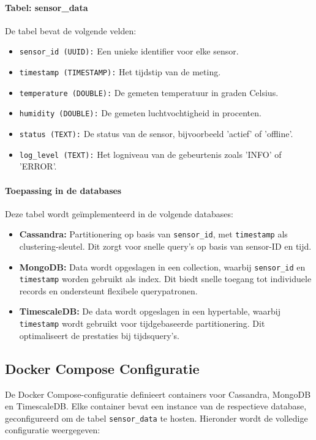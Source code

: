 \paragraph{Tabel: sensor\_data}
De tabel bevat de volgende velden:
\begin{itemize}
    \item \texttt{sensor\_id (UUID):} Een unieke identifier voor elke sensor.
    \item \texttt{timestamp (TIMESTAMP):} Het tijdstip van de meting.
    \item \texttt{temperature (DOUBLE):} De gemeten temperatuur in graden Celsius.
    \item \texttt{humidity (DOUBLE):} De gemeten luchtvochtigheid in procenten.
    \item \texttt{status (TEXT):} De status van de sensor, bijvoorbeeld 'actief' of 'offline'.
    \item \texttt{log\_level (TEXT):} Het logniveau van de gebeurtenis zoals 'INFO' of 'ERROR'.
\end{itemize}

\paragraph{Toepassing in de databases}
Deze tabel wordt geïmplementeerd in de volgende databases:
\begin{itemize}
    \item \textbf{Cassandra:} Partitionering op basis van \texttt{sensor\_id}, met \texttt{timestamp} als clustering-sleutel. Dit zorgt voor snelle query's op basis van sensor-ID en tijd.
    \item \textbf{MongoDB:} Data wordt opgeslagen in een collection, waarbij \texttt{sensor\_id} en \texttt{timestamp} worden gebruikt als index. Dit biedt snelle toegang tot individuele records en ondersteunt flexibele querypatronen.
    \item \textbf{TimescaleDB:} De data wordt opgeslagen in een hypertable, waarbij \texttt{timestamp} wordt gebruikt voor tijdgebaseerde partitionering. Dit optimaliseert de prestaties bij tijdsquery's.
\end{itemize}

\subsection{Docker Compose Configuratie}
De Docker Compose-configuratie definieert containers voor Cassandra, MongoDB en TimescaleDB. Elke container bevat een instance van de respectieve database, geconfigureerd om de tabel \texttt{sensor\_data} te hosten. Hieronder wordt de volledige configuratie weergegeven:

